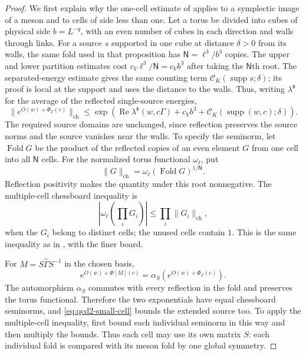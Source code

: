 \documentclass[11pt,letterpaper,reqno]{amsart}
\theoremstyle{definition}
\theoremstyle{remark}
\begin{document}
\begin{proof}
We first explain why the one-cell estimate of
\cite[Prop. 10.17]{QCDM1} applies
to a symplectic image of a meson and to cells of side less
than one. Let a torus be divided into cubes of physical side
$b=L^{-q}$, with an even number of cubes in each direction
and walls through links. For a source $s$ supported in one
cube at distance $\delta>0$ from its walls, the same fold
used in that proposition has $\mathsf N=\ell^3/b^3$ copies.
The upper and lower partition estimates cost
$c_V\ell^3/\mathsf N=c_Vb^3$ after taking the
$\mathsf N$th root. The separated-energy estimate gives
the same counting term
$\mathscr C_K(\operatorname{supp}s;\delta)$; its proof is
local at the support and uses the distance to the walls.
Thus, writing $\lambda^{\mathfrak b}$ for the average of
the reflected single-source energies,
\begin{equation}\label{eq:qcd2-small-cell}
 \|e^{O(w)+\Phi_\Gamma(c)}\|_{\mathrm{ch}}
 \le\exp\left(\operatorname{Re}\lambda^{\mathfrak b}(w,c\Gamma)
       +c_Vb^3+\mathscr C_K(\operatorname{supp}(w,c);\delta)\right).
\end{equation}
The required source domains are unchanged, since reflection
preserves the source norms and the source vanishes near the
walls. To specify the seminorm, let $\operatorname{Fold}G$
be the product of the reflected copies of an even element
$G$ from one cell into all $\mathsf N$ cells. For the normalized
torus functional $\omega_\ell$, put
\[
 \|G\|_{\mathrm{ch}}
       =\omega_\ell(\operatorname{Fold}G)^{1/\mathsf N}.
\]
Reflection positivity makes the quantity under this root
nonnegative. The multiple-cell chessboard inequality is
\[
 \left|\omega_\ell\left(\prod_iG_i\right)\right|
       \le\prod_i\|G_i\|_{\mathrm{ch}},
\]
when the $G_i$ belong to distinct cells; the unused cells
contain $1$. This is the same inequality as in
\cite[Prop. 10.17 and its proof]{QCDM1}, with the finer board.

For $M=S\widehat\Gamma S^{-1}$ in the chosen basis,
\[
 e^{O(w)+\Phi[M](c)}
       =\alpha_S(e^{O(w)+\Phi_\Gamma(c)}).
\]
The automorphism $\alpha_S$ commutes with every reflection
in the fold and preserves the torus functional. Therefore
the two exponentials have equal chessboard seminorms, and
\eqref{eq:qcd2-small-cell} bounds the extended source too.
To apply the multiple-cell inequality, first bound each
individual seminorm in this way and then multiply the bounds.
Thus each cell may use its own matrix $S$: each individual
fold is compared with its meson fold by one global symmetry.


\end{proof}
\end{document}
